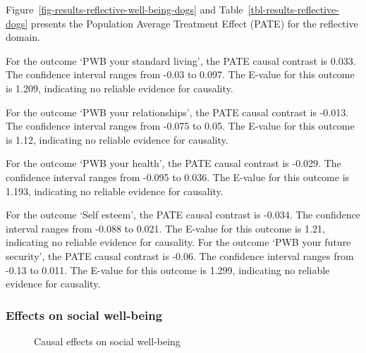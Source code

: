 \documentclass[
  singlecolumn,
  9pt]{article}
\begin{document}
Figure~\ref{fig-results-reflective-well-being-dogs} and
Table~\ref{tbl-results-reflective-dogs} presents the Population Average
Treatment Effect (PATE) for the reflective domain.

For the outcome `PWB your standard living', the PATE causal contrast is
0.033. The confidence interval ranges from -0.03 to 0.097. The E-value
for this outcome is 1.209, indicating no reliable evidence for
causality.

For the outcome `PWB your relationships', the PATE causal contrast is
-0.013. The confidence interval ranges from -0.075 to 0.05. The E-value
for this outcome is 1.12, indicating no reliable evidence for causality.

For the outcome `PWB your health', the PATE causal contrast is -0.029.
The confidence interval ranges from -0.095 to 0.036. The E-value for
this outcome is 1.193, indicating no reliable evidence for causality.

For the outcome `Self esteem', the PATE causal contrast is -0.034. The
confidence interval ranges from -0.088 to 0.021. The E-value for this
outcome is 1.21, indicating no reliable evidence for causality. For the
outcome `PWB your future security', the PATE causal contrast is -0.06.
The confidence interval ranges from -0.13 to 0.011. The E-value for this
outcome is 1.299, indicating no reliable evidence for causality.

\newpage{}

\subsubsection{Effects on social
well-being}\label{effects-on-social-well-being-1}

\begin{figure}


\caption{\label{fig-results-social-wellbeing-dogs}Causal effects on
social well-being}

\end{figure}%

\newpage{}
\end{document}

